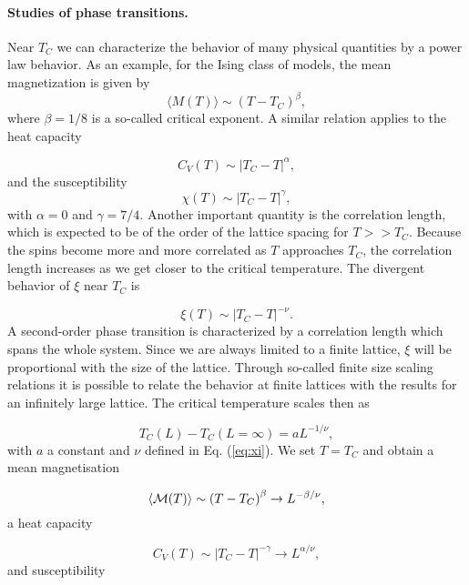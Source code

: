 \documentclass[%
oneside,                 %
final,                   %
10pt]{article}
\begin{document}
\paragraph{Studies of phase transitions.}
Near $T_C$ we can characterize the behavior of many physical quantities
by a power law behavior.
As an example, for the Ising class of models, 
the mean magnetization is given by
\[
  \langle M(T) \rangle \sim \left(T-T_C\right)^{\beta},
\]
where $\beta=1/8$ is a so-called critical exponent. A similar relation
applies to the heat capacity

\[
  C_V(T) \sim \left|T_C-T\right|^{\alpha},
\]
and the susceptibility
\begin{equation}
  \chi(T) \sim \left|T_C-T\right|^{\gamma},
\end{equation}
with $\alpha = 0$ and $\gamma = 7/4$.
Another important quantity is the correlation length, which is expected
to be of the order of the lattice spacing for $T>> T_C$. Because the spins
become more and more correlated as $T$ approaches $T_C$, the correlation
length increases as we get closer to the critical temperature. The divergent
behavior of $\xi$ near $T_C$ 
is

\begin{equation}
  \xi(T) \sim \left|T_C-T\right|^{-\nu}.
  \label{eq:xi}
\end{equation}
A second-order phase transition is characterized by a
correlation length which spans the whole system.
Since we are always limited to a finite lattice, $\xi$ will
be proportional with the size of the lattice. 
Through so-called finite size scaling relations
it is possible to relate the behavior at finite lattices with the 
results for an infinitely large lattice.
The critical temperature scales then as

\begin{equation}
 T_C(L)-T_C(L=\infty) = aL^{-1/\nu},
 \label{eq:tc}
\end{equation}
with  $a$ a constant and  $\nu$ defined in Eq. (\ref{eq:xi}).
We set $T=T_C$ and obtain a mean magnetisation

\begin{equation}
  \langle {\cal M}(T) \rangle \sim \left(T-T_C\right)^{\beta}
  \rightarrow L^{-\beta/\nu},
  \label{eq:scale1}
\end{equation}
a heat capacity

\begin{equation}
  C_V(T) \sim \left|T_C-T\right|^{-\gamma} \rightarrow L^{\alpha/\nu},
  \label{eq:scale2}
\end{equation}
and susceptibility
\end{document}
